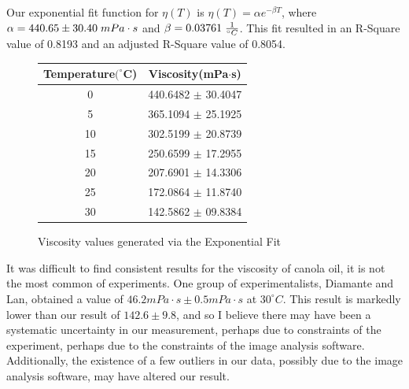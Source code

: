 \documentclass[aps,twocolumn,showpacs,preprintnumbers]{revtex4}
\begin{document}
Our exponential fit function for $\eta (T)$ is $\eta (T) = \alpha e^{-\beta T}$, where $\alpha = 440.65 \pm 30.40 \hspace{0.1cm} mPa\cdot s$ and $\beta = 0.03761 \hspace{0.1cm} \frac{1}{^{\circ}C}$. This fit resulted in an R-Square value of 0.8193 and an adjusted R-Square value of 0.8054. 

\begin{figure}[!h]
\begin{center}
\begin{tabular}{ |c|c| } 
 \hline
Temperature$(^{\circ}$C) & Viscosity(mPa$\cdot$s) \\ 
 \hline
0 & 440.6482 $\pm$ 30.4047 \\
5 & 365.1094  $\pm$ 25.1925 \\
10 & 302.5199 $\pm$ 20.8739  \\
15 & 250.6599  $\pm$ 17.2955 \\
20 & 207.6901 $\pm$ 14.3306  \\
25 & 172.0864  $\pm$ 11.8740 \\
30 & 142.5862  $\pm$ 09.8384 \\




 \hline
\end{tabular}

\caption{\label{table1} Viscosity values generated via the Exponential Fit
}

\end{center}

\end{figure}



It was difficult to find consistent results for the viscosity of canola oil, it is not the most common of experiments. One group of experimentalists, Diamante and Lan\cite{Diamante and Lan}, obtained a value of $46.2 mPa\cdot s \pm 0.5 mPa\cdot s$ at $30 ^{\circ}C$. 
This result is markedly lower than our result of $142.6 \pm 9.8$, and so I believe there may have been a systematic uncertainty in our measurement, perhaps due to constraints of the experiment, perhaps due to the constraints of the image analysis software. Additionally, the existence of a few outliers in our data, possibly due to the image analysis software, may have altered our result.
\end{document}
